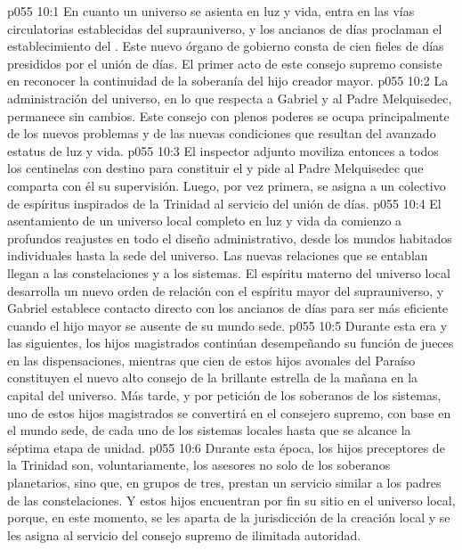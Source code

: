 \vs p055 10:1 En cuanto un universo se asienta en luz y vida, entra en las vías circulatorias establecidas del suprauniverso, y los ancianos de días proclaman el establecimiento del . Este nuevo órgano de gobierno consta de cien fieles de días presididos por el unión de días. El primer acto de este consejo supremo consiste en reconocer la continuidad de la soberanía del hijo creador mayor.
\vs p055 10:2 La administración del universo, en lo que respecta a Gabriel y al Padre Melquisedec, permanece sin cambios. Este consejo con plenos poderes se ocupa principalmente de los nuevos problemas y de las nuevas condiciones que resultan del avanzado estatus de luz y vida.
\vs p055 10:3 \pc El inspector adjunto moviliza entonces a todos los centinelas con destino para constituir el  y pide al Padre Melquisedec que comparta con él su supervisión. Luego, por vez primera, se asigna a un colectivo de espíritus inspirados de la Trinidad al servicio del unión de días.
\vs p055 10:4 \pc El asentamiento de un universo local completo en luz y vida da comienzo a profundos reajustes en todo el diseño administrativo, desde los mundos habitados individuales hasta la sede del universo. Las nuevas relaciones que se entablan llegan a las constelaciones y a los sistemas. El espíritu materno del universo local desarrolla un nuevo orden de relación con el espíritu mayor del suprauniverso, y Gabriel establece contacto directo con los ancianos de días para ser más eficiente cuando el hijo mayor se ausente de su mundo sede.
\vs p055 10:5 Durante esta era y las siguientes, los hijos magistrados continúan desempeñando su función de jueces en las dispensaciones, mientras que cien de estos hijos avonales del Paraíso constituyen el nuevo alto consejo de la brillante estrella de la mañana en la capital del universo. Más tarde, y por petición de los soberanos de los sistemas, uno de estos hijos magistrados se convertirá en el consejero supremo, con base en el mundo sede, de cada uno de los sistemas locales hasta que se alcance la séptima etapa de unidad.
\vs p055 10:6 Durante esta época, los hijos preceptores de la Trinidad son, voluntariamente, los asesores no solo de los soberanos planetarios, sino que, en grupos de tres, prestan un servicio similar a los padres de las constelaciones. Y estos hijos encuentran por fin su sitio en el universo local, porque, en este momento, se les aparta de la jurisdicción de la creación local y se les asigna al servicio del consejo supremo de ilimitada autoridad.
